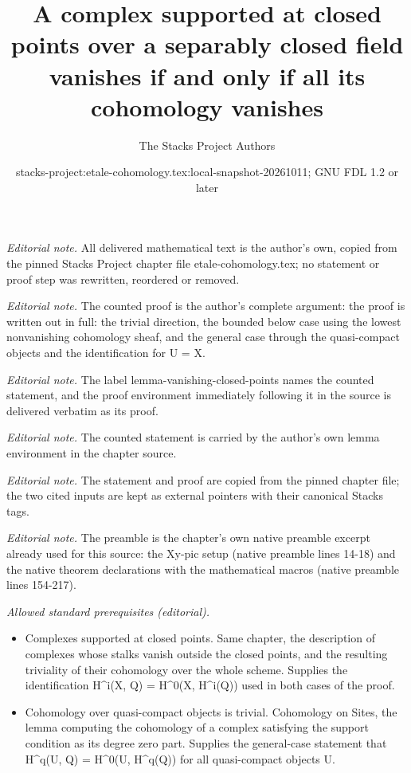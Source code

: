 \documentclass[10pt,a4paper]{amsart}
\title{A complex supported at closed points over a separably closed field vanishes if and only if all its cohomology vanishes}
\author{The Stacks Project Authors}
\date{stacks-project:etale-cohomology.tex:local-snapshot-20261011; GNU FDL 1.2 or later}
\theoremstyle{plain}
\theoremstyle{definition}
\theoremstyle{remark}
\numberwithin{equation}{subsection}
\begin{document}
\maketitle
\noindent\textit{Editorial note.} All delivered mathematical text is the author's own, copied from the pinned Stacks Project chapter file etale-cohomology.tex; no statement or proof step was rewritten, reordered or removed.\par\medskip
\noindent\textit{Editorial note.} The counted proof is the author's complete argument: the proof is written out in full: the trivial direction, the bounded below case using the lowest nonvanishing cohomology sheaf, and the general case through the quasi-compact objects and the identification for U = X.\par\medskip
\noindent\textit{Editorial note.} The label lemma-vanishing-closed-points names the counted statement, and the proof environment immediately following it in the source is delivered verbatim as its proof.\par\medskip
\noindent\textit{Editorial note.} The counted statement is carried by the author's own lemma environment in the chapter source.\par\medskip
\noindent\textit{Editorial note.} The statement and proof are copied from the pinned chapter file; the two cited inputs are kept as external pointers with their canonical Stacks tags.\par\medskip
\noindent\textit{Editorial note.} The preamble is the chapter's own native preamble excerpt already used for this source: the Xy-pic setup (native preamble lines 14-18) and the native theorem declarations with the mathematical macros (native preamble lines 154-217).\par\medskip
\noindent\textit{Allowed standard prerequisites (editorial).}\begin{itemize}
\item Complexes supported at closed points. Same chapter, the description of complexes whose stalks vanish outside the closed points, and the resulting triviality of their cohomology over the whole scheme. Supplies the identification H\textasciicircum{}i(X, Q) = H\textasciicircum{}0(X, H\textasciicircum{}i(Q)) used in both cases of the proof.
\item Cohomology over quasi-compact objects is trivial. Cohomology on Sites, the lemma computing the cohomology of a complex satisfying the support condition as its degree zero part. Supplies the general-case statement that H\textasciicircum{}q(U, Q) = H\textasciicircum{}0(U, H\textasciicircum{}q(Q)) for all quasi-compact objects U.
\end{itemize}\medskip
\end{document}
